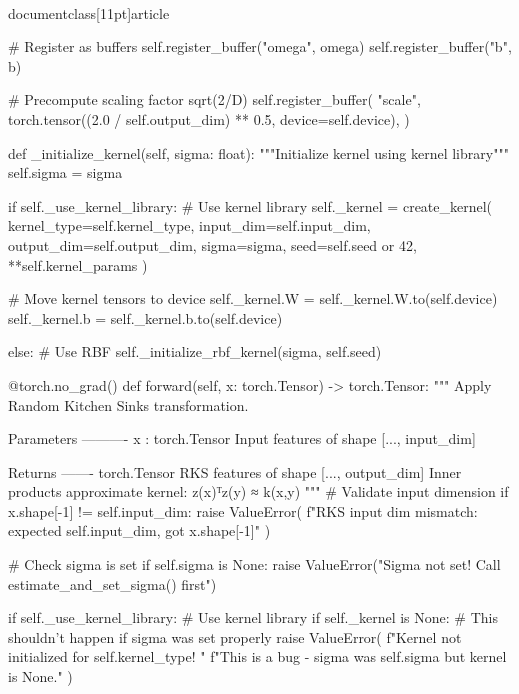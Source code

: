 \\documentclass[11pt]{article}
\begin{document}
\begin{CodeBlock}
        # Register as buffers
        self.register_buffer("omega", omega)
        self.register_buffer("b", b)

        # Precompute scaling factor sqrt(2/D)
        self.register_buffer(
            "scale",
            torch.tensor((2.0 / self.output_dim) ** 0.5, device=self.device),
        )
    
    def _initialize_kernel(self, sigma: float):
        """Initialize kernel using kernel library"""
        self.sigma = sigma
        
        if self._use_kernel_library:
            # Use kernel library
            self._kernel = create_kernel(
                kernel_type=self.kernel_type,
                input_dim=self.input_dim,
                output_dim=self.output_dim,
                sigma=sigma,
                seed=self.seed or 42,
                **self.kernel_params
            )
            
            # Move kernel tensors to device
            self._kernel.W = self._kernel.W.to(self.device)
            self._kernel.b = self._kernel.b.to(self.device)
            
        else:
            # Use RBF
            self._initialize_rbf_kernel(sigma, self.seed)

    @torch.no_grad()
    def forward(self, x: torch.Tensor) -> torch.Tensor:
        """
        Apply Random Kitchen Sinks transformation.
        
        Parameters
        ----------
        x : torch.Tensor
            Input features of shape [..., input_dim]
        
        Returns
        -------
        torch.Tensor
            RKS features of shape [..., output_dim]
            Inner products approximate kernel: z(x)ᵀz(y) ≈ k(x,y)
        """
        # Validate input dimension
        if x.shape[-1] != self.input_dim:
            raise ValueError(
                f"RKS input dim mismatch: expected {self.input_dim}, got {x.shape[-1]}"
            )

        # Check sigma is set
        if self.sigma is None:
            raise ValueError("Sigma not set! Call estimate_and_set_sigma() first")
        
        if self._use_kernel_library:
            # Use kernel library
            if self._kernel is None:
                # This shouldn't happen if sigma was set properly
                raise ValueError(
                    f"Kernel not initialized for {self.kernel_type}! "
                    f"This is a bug - sigma was {self.sigma} but kernel is None."
                )
            

\end{CodeBlock}
\end{document}
